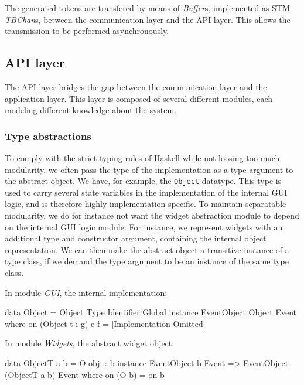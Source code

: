 \documentclass[11pt,a4paper]{article}
\begin{document}
The generated tokens are transfered by means of \textit{Buffer}s, implemented as STM \textit{TBChan}s, between the communication layer and the API layer.
This allows the transmission to be performed asynchronously.

\subsection{API layer}
The API layer bridges the gap between the communication layer and the application layer.
This layer is composed of several different modules, each modeling different knowledge about the system.

\subsubsection{Type abstractions}
To comply with the strict typing rules of Haskell while not loosing too much modularity, we often pass the type of the implementation as a type argument to the abstract object.
We have, for example, the \texttt{Object} datatype.
This type is used to carry several state variables in the implementation of the internal GUI logic, and is therefore highly implementation specific.
To maintain separatable modularity, we do for instance not want the widget abstraction module to depend on the internal GUI logic module.
For instance, we represent widgets with an additional type and constructor argument, containing the internal object representation.
We can then make the abstract object a transitive instance of a type class, if we demand the type argument to be an instance of the same type class.

In module \textit{GUI}, the internal implementation:
\begin{haskell}
data Object = Object Type Identifier Global
instance EventObject Object Event where
    on (Object t i g) e f = [Implementation Omitted]
\end{haskell}

In module \textit{Widgets}, the abstract widget object:
\begin{haskell}
data ObjectT a b = O { obj :: b }
instance EventObject b Event => EventObject (ObjectT a b) Event where
    on (O b) = on b
\end{haskell}
\end{document}
